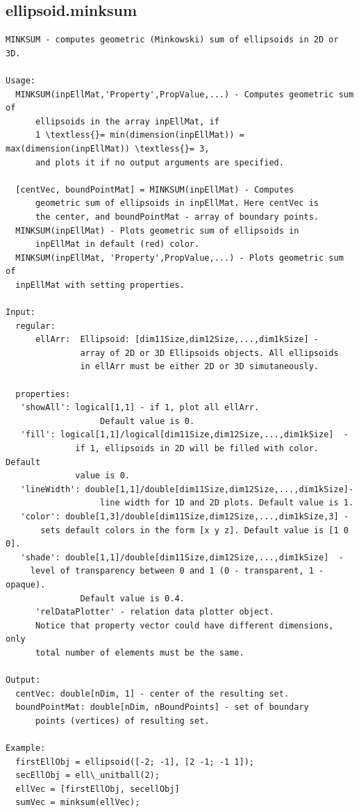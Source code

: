 \documentclass[letterpaper,10pt,english]{sphinxmanual}
\begin{document}
\subsection{ellipsoid.minksum}
\label{chap_functions:ellipsoid-minksum}
\begin{Verbatim}[commandchars=\\\{\}]
MINKSUM - computes geometric (Minkowski) sum of ellipsoids in 2D or 3D.

Usage:
  MINKSUM(inpEllMat,'Property',PropValue,...) - Computes geometric sum of
      ellipsoids in the array inpEllMat, if
      1 \textless{}= min(dimension(inpEllMat)) = max(dimension(inpEllMat)) \textless{}= 3,
      and plots it if no output arguments are specified.

  [centVec, boundPointMat] = MINKSUM(inpEllMat) - Computes
      geometric sum of ellipsoids in inpEllMat. Here centVec is
      the center, and boundPointMat - array of boundary points.
  MINKSUM(inpEllMat) - Plots geometric sum of ellipsoids in
      inpEllMat in default (red) color.
  MINKSUM(inpEllMat, 'Property',PropValue,...) - Plots geometric sum of
  inpEllMat with setting properties.

Input:
  regular:
      ellArr:  Ellipsoid: [dim11Size,dim12Size,...,dim1kSize] -
               array of 2D or 3D Ellipsoids objects. All ellipsoids
               in ellArr must be either 2D or 3D simutaneously.

  properties:
   'showAll': logical[1,1] - if 1, plot all ellArr.
                   Default value is 0.
   'fill': logical[1,1]/logical[dim11Size,dim12Size,...,dim1kSize]  -
              if 1, ellipsoids in 2D will be filled with color. Default
              value is 0.
   'lineWidth': double[1,1]/double[dim11Size,dim12Size,...,dim1kSize]-
                   line width for 1D and 2D plots. Default value is 1.
   'color': double[1,3]/double[dim11Size,dim12Size,...,dim1kSize,3] -
       sets default colors in the form [x y z]. Default value is [1 0 0].
   'shade': double[1,1]/double[dim11Size,dim12Size,...,dim1kSize]  -
     level of transparency between 0 and 1 (0 - transparent, 1 - opaque).
               Default value is 0.4.
      'relDataPlotter' - relation data plotter object.
      Notice that property vector could have different dimensions, only
      total number of elements must be the same.

Output:
  centVec: double[nDim, 1] - center of the resulting set.
  boundPointMat: double[nDim, nBoundPoints] - set of boundary
      points (vertices) of resulting set.

Example:
  firstEllObj = ellipsoid([-2; -1], [2 -1; -1 1]);
  secEllObj = ell\_unitball(2);
  ellVec = [firstEllObj, secellObj]
  sumVec = minksum(ellVec);
\end{Verbatim}
\end{document}
